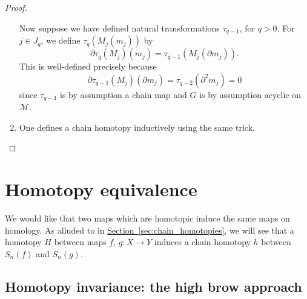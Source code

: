 \documentclass[main.tex]{subfiles}
\begin{document}
\begin{proof}
\begin{enumerate}
      Now suppose we have defined natural transformations $\tau_{q-1}$, for $q > 0$. For $j \in J_{q}$, we define $\tau_{q}(M_{j}(m_{j}))$ by
      \begin{equation*}
        \partial \tau_{q}(M_{j})(m_{j}) = \tau_{q-1}(M_{j}(\partial m_{j})).
      \end{equation*}
      This is well-defined precisely because
      \begin{equation*}
        \partial \tau_{q-1}(M_{j})(\partial m_{j}) = \tau_{q-2}(\partial^{2} m_{j}) = 0
      \end{equation*}
      since $\tau_{q-1}$ is by assumption a chain map and $G$ is by assumption acyclic on $\mathcal{M}$.

    \item One defines a chain homotopy inductively using the same trick.
  \end{enumerate}
\end{proof}

\section{Homotopy equivalence}
\label{sec:homotopy_equivalence}

We would like that two maps which are homotopic induce the same maps on homology. As alluded to in \hyperref[sec:chain_homotopies]{Section~\ref*{sec:chain_homotopies}}, we will see that a homotopy $H$ between maps $f$, $g\colon X \to Y$ induces a chain homotopy $h$ between $S_{n}(f)$ and $S_{n}(g)$.

\subsection{Homotopy invariance: the high brow approach}
\label{ssc:homotopy_invariance_the_high_brow_approach}
\end{document}

